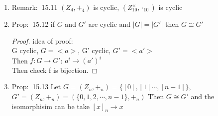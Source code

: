 \documentclass[12pt]{article}
\newcommand{\prop}{{\color{blue} Prop: $\ $}}
\newcommand{\rem}{{\color{blue} Remark: $\ $}}
\begin{document}
\begin{enumerate}
\begin{enumerate}
        \item \rem 15.11 $(Z_4, +_4)$ is cyclic, $(Z_{10}^{\times}, \cdot_{10})$ is cyclic
        \item \prop 15.12 if $G$ and $G'$ are cyclic and $|G| = |G'|$ then $G\cong G'$ 
        \begin{proof}
            idea of proof: \\
            G cyclic, $G = <a>$, G' cyclic, $G' =<a'>$ \\
            Then $f: G \rightarrow G'$: $a^i \rightarrow (a')^i$\\
            Then check f is bijection.
        \end{proof}
        \item \prop 15.13 Let $G = (Z_n, +_n) = \{[0], [1] \cdots, [n-1]\}$, $G' = (Z_n, +_n) = (\{0,1,2,\cdots, n-1\}, +_n)$
        Then $G\cong G'$ and the isomorphisim can be take $[x]_n \rightarrow x$

    \end{enumerate}


\end{enumerate}
\end{document}
